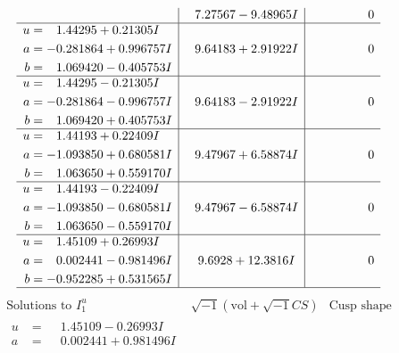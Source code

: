 \documentclass[1p]{elsarticle_modified}
\theoremstyle{definition}
\newcommand{\I}{\sqrt{-1}}
\begin{document}
$$\begin{array}{c|c|c}
 & \phantom{-}7.27567 - 9.48965 I & \phantom{-0.000000 } 0 \\ \hline\begin{aligned}
u &= \phantom{-}1.44295 + 0.21305 I \\
a &= -0.281864 + 0.996757 I \\
b &= \phantom{-}1.069420 - 0.405753 I\end{aligned}
 & \phantom{-}9.64183 + 2.91922 I & \phantom{-0.000000 } 0 \\ \hline\begin{aligned}
u &= \phantom{-}1.44295 - 0.21305 I \\
a &= -0.281864 - 0.996757 I \\
b &= \phantom{-}1.069420 + 0.405753 I\end{aligned}
 & \phantom{-}9.64183 - 2.91922 I & \phantom{-0.000000 } 0 \\ \hline\begin{aligned}
u &= \phantom{-}1.44193 + 0.22409 I \\
a &= -1.093850 + 0.680581 I \\
b &= \phantom{-}1.063650 + 0.559170 I\end{aligned}
 & \phantom{-}9.47967 + 6.58874 I & \phantom{-0.000000 } 0 \\ \hline\begin{aligned}
u &= \phantom{-}1.44193 - 0.22409 I \\
a &= -1.093850 - 0.680581 I \\
b &= \phantom{-}1.063650 - 0.559170 I\end{aligned}
 & \phantom{-}9.47967 - 6.58874 I & \phantom{-0.000000 } 0 \\ \hline\begin{aligned}
u &= \phantom{-}1.45109 + 0.26993 I \\
a &= \phantom{-}0.002441 - 0.981496 I \\
b &= -0.952285 + 0.531565 I\end{aligned}
 & \phantom{-}9.6928 + 12.3816 I & \phantom{-0.000000 } 0\\
 \hline 
 \end{array}$$\newpage$$\begin{array}{c|c|c}  
\text{Solutions to }I^u_{1}& \I (\text{vol} + \sqrt{-1}CS) & \text{Cusp shape}\\
 \hline 
\begin{aligned}
u &= \phantom{-}1.45109 - 0.26993 I \\
a &= \phantom{-}0.002441 + 0.981496 I \\

\end{aligned}
\end{array}$$
\end{document}
